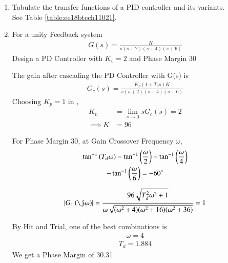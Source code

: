 \begin{enumerate}[label=\thesubsection.\arabic*.,ref=\thesubsection.\theenumi]

\item Tabulate the transfer functions of a PID controller and its variants.
\\
\solution See Table \ref{table:ee18btech11021}.

\begin{table}[!ht]
\centering

\caption{}
\label{table:ee18btech11021}
\end{table}


\item
For a unity Feedback system 
\begin{align}
    G(s) = \frac{K}{s(s+2)(s+4)(s+6)}
\end{align}
%
Design a PD Controller with $K_{v} = 2$ and Phase Margin 30\degree

\solution The gain after cascading the PD Controller with  G(s) is 
%
\begin{align}
    G_{c}(s) = \frac{K_{p}(1 + T_{d}s)K}{s(s+2)(s+4)(s+6)}
\label{eq:ee18btech11021}
\end{align}
%
Choosing  $K_{p} = 1$ in \label{eq:ee18btech11021},
%
\begin{align}
    K_{v} &= \lim_{s \to 0} sG_{c}(s) = 2
\\
    \implies K &= 96
\end{align}

For Phase Margin 30\degree, at Gain Crossover Frequency $\omega$,
%
\begin{multline}
    \tan^{-1}\left(T_{d}\omega\right) - \tan^{-1}\left(\frac{\omega}{2}\right) - \tan^{-1}\left(\frac{\omega}{4}\right)
\\
-    \tan^{-1}\left(\frac{\omega}{6}\right) = -60 \degree
\end{multline}

\begin{align}
    \abs{G_{1}\brak{\j\omega}} = \frac{96\sqrt{T_{d}^2\omega^2 + 1}}{\omega\sqrt{(\omega^2+4)(\omega^2 + 16)(\omega^2 + 36)}} = 1
\end{align}

By Hit and Trial, one of the best combinations is
\begin{align}
    \omega = 4
\end{align}
\begin{align}
    T_{d} = 1.884
\end{align}
We get a Phase Margin of 30.31\degree


\end{enumerate}
